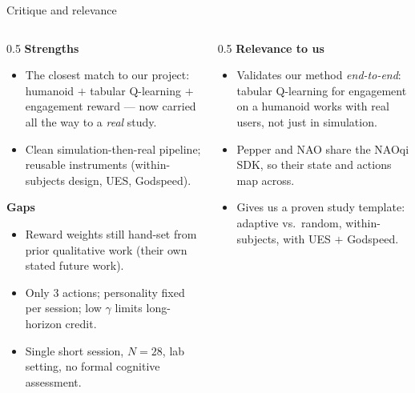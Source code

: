 \documentclass[aspectratio=169,10pt]{beamer}
\begin{document}
\begin{frame}{Critique and relevance}
  \begin{columns}[T]
    \begin{column}{0.5\textwidth}
      \textbf{Strengths}
      \begin{itemize}\footnotesize
        \item The closest match to our project: humanoid $+$ tabular Q-learning $+$ engagement reward --- now carried all the way to a \emph{real} study.
        \item Clean simulation-then-real pipeline; reusable instruments (within-subjects design, UES, Godspeed).
      \end{itemize}
      \textbf{Gaps}
      \begin{itemize}\footnotesize
        \item Reward weights still hand-set from prior qualitative work (their own stated future work).
        \item Only 3 actions; personality fixed per session; low $\gamma$ limits long-horizon credit.
        \item Single short session, $N{=}28$, lab setting, no formal cognitive assessment.
      \end{itemize}
    \end{column}
    \begin{column}{0.5\textwidth}
      \textbf{Relevance to us}
      \begin{itemize}\footnotesize
        \item Validates our method \emph{end-to-end}: tabular Q-learning for engagement on a humanoid works with real users, not just in simulation.
        \item Pepper and NAO share the NAOqi SDK, so their state and actions map across.
        \item Gives us a proven study template: adaptive vs.\ random, within-subjects, with UES $+$ Godspeed.
      \end{itemize}
    \end{column}
  \end{columns}
\end{frame}


\end{document}
